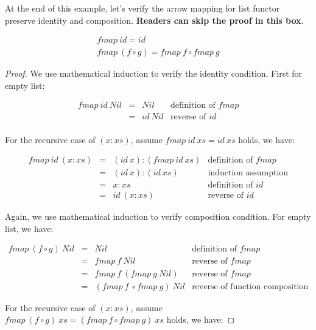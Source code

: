 \documentclass[b5paper]{article}
\begin{document}
\begin{example}
\begin{mdframed}
At the end of this example, let's verify the arrow mapping for list functor preserve identity and composition. \textbf{Readers can skip the proof in this box}.

\[
\begin{array}{l}
fmap\ id = id \\
fmap\ (f \circ g) = fmap\ f \circ fmap\ g
\end{array}
\]

\begin{proof}
We use mathematical induction to verify the identity condition. First for empty list:

\[
\begin{array}{rcll}
fmap\ id\ Nil & = & Nil & \text{definition of $fmap$} \\
              & = & id\ Nil & \text{reverse of $id$} \\
\end{array}
\]

For the recursive case of $(x:xs)$, assume $fmap\ id\ xs = id\ xs$ holds, we have:

\[
\begin{array}{rcll}
fmap\ id\ (x:xs) & = & (id\ x):(fmap\ id\ xs) & \text{definition of $fmap$} \\
                 & = & (id\ x):(id\ xs) & \text{induction assumption} \\
                 & = & x:xs & \text{definition of $id$} \\
                 & = & id\ (x:xs) & \text{reverse of $id$}
\end{array}
\]

Again, we use mathematical induction to verify composition condition. For empty list, we have:

\[
\begin{array}{rcll}
fmap\ (f \circ g)\ Nil & = & Nil & \text{definition of $fmap$} \\
           & = & fmap\ f\ Nil & \text{reverse of $fmap$} \\
           & = & fmap\ f\ (fmap\ g\ Nil) & \text{reverse of $fmap$} \\
           & = & (fmap\ f\ \circ fmap\ g)\ Nil & \text{reverse of function composition}
\end{array}
\]

For the recursive case of $(x:xs)$, assume $fmap\ (f \circ g)\ xs = (fmap\ f \circ fmap\ g)\ xs$ holds, we have:


\end{proof}
\end{mdframed}
\end{example}
\end{document}
